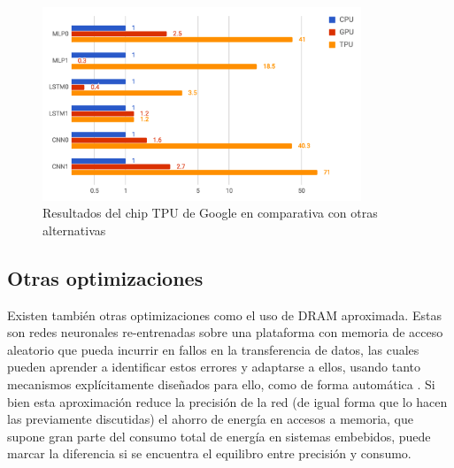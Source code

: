 \begin{figure}[h!]
    \centering
    \includegraphics[width=0.85\textwidth]{img/tpu_benchmarks.png}
    \caption{Resultados del chip TPU de Google en comparativa con otras alternativas}
    \label{fig:tpu_benchmarks}
\end{figure}

\subsection{Otras optimizaciones}
\label{ssec:otras_optimizaciones}
Existen también otras optimizaciones como el uso de DRAM aproximada. Estas son redes neuronales re-entrenadas sobre una plataforma con memoria de acceso aleatorio que pueda incurrir en fallos en la transferencia de datos, las cuales pueden aprender a identificar estos errores y adaptarse a ellos, usando tanto mecanismos explícitamente diseñados para ello, como de forma automática \cite{deep_learning_for_computer_architects} \cite{koppula2019eden}. Si bien esta aproximación reduce la precisión de la red (de igual forma que lo hacen las previamente discutidas) el ahorro de energía en accesos a memoria, que supone gran parte del consumo total de energía en sistemas embebidos, puede marcar la diferencia si se encuentra el equilibro entre precisión y consumo.